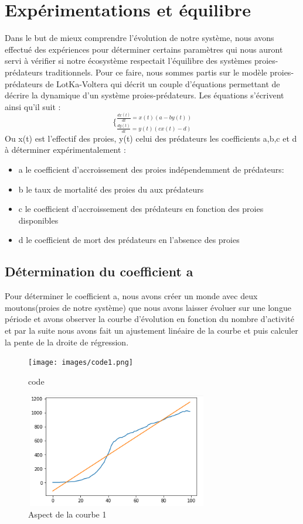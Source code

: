 \documentclass[a4paper,12pt]{article} %
\begin{document}
\section{Expérimentations et équilibre}
Dans le but de mieux comprendre l'évolution de notre système, nous avons effectué des expériences pour déterminer certains paramètres qui nous auront servi à vérifier si notre écosystème respectait l'équilibre des systèmes proies-prédateurs traditionnels. Pour ce faire, nous sommes partis sur le modèle proies-prédateurs de LotKa-Voltera qui décrit un couple d'équations permettant de décrire la dynamique d'un système proies-prédateurs. Les équations s'écrivent ainsi qu'il suit :
\begin{equation}
    \lbrace_{\frac{dy(t)}{dt}  =  y(t)(cx(t) - d)} ^{\frac{dx(t)}{dt} = x(t)(a - by(t))}
\end{equation}
Ou x(t) est l'effectif des proies, y(t) celui des prédateurs les coefficients a,b,c et d à déterminer expérimentalement :
\begin{itemize}
    \item a le coefficient d'accroissement des proies indépendemment de prédateurs:
    \item b le taux de mortalité des proies du aux prédateurs
    \item c le coefficient d'accroissement des prédateurs en fonction des proies disponibles
    \item d le coefficient de mort des prédateurs en l'absence des proies
\end{itemize}

\subsection{Détermination du coefficient a}
Pour déterminer le coefficient a, nous avons créer un monde avec deux moutons(proies de notre système) que nous avons laisser évoluer sur une longue période et avons observer la courbe d'évolution en fonction du nombre d'activité et par la suite nous avons fait un ajustement linéaire de la courbe et puis calculer la pente de la droite de régression.

\begin{figure}[h]
    \begin{minipage}[c]{.46\linewidth}
        \centering
        \texttt{[image: images/code1.png]}
        \caption{code}
    \end{minipage}
    \hfill%
    \begin{minipage}[c]{.46\linewidth}
        \centering
        \includegraphics[width=8cm, height=5cm]{images/courbe1.png}
        \caption{Aspect de la courbe 1}
    \end{minipage}
\end{figure}
\end{document}
